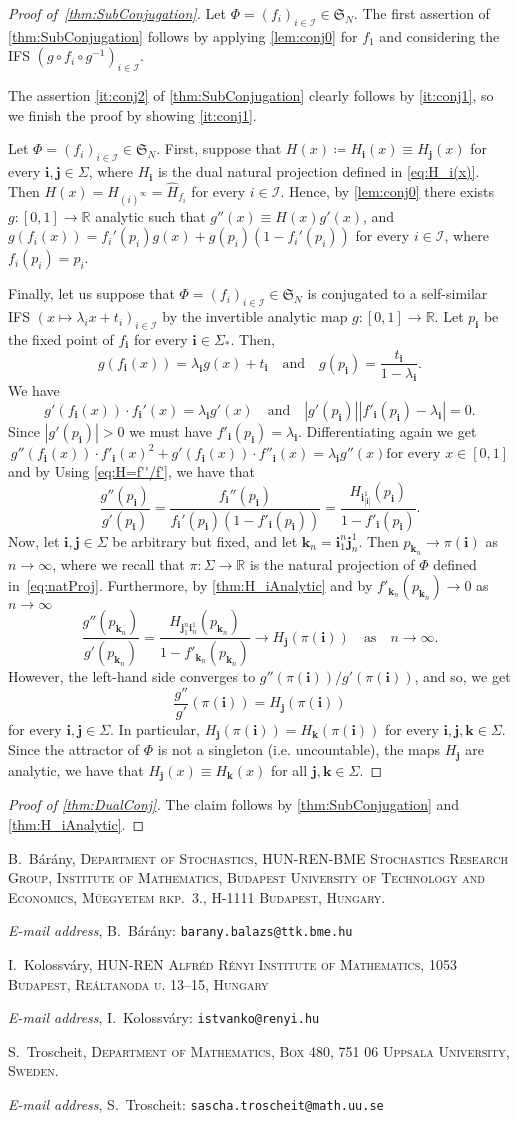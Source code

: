 \documentclass[11pt,]{article}
\makeatletter
\def\cref#1{\ref{#1}}%
\theoremstyle{definition}
\theoremstyle{remark}
\newcommand{\0}{\mathbf{0}}
\newcommand{\bi}{\mathbf{i}}
\newcommand{\bj}{\mathbf{j}}
\newcommand{\bk}{{\mathbf{k}}}
\numberwithin{equation}{section}
\newcommand{\Addresses}{{%
  \bigskip
  \footnotesize

  B.~B\'ar\'any, \textsc{Department of Stochastics, HUN-REN-BME Stochastics Research Group,
  Institute of Mathematics, Budapest University of Technology and Economics, M\H{u}egyetem rkp.~3.,
H-1111 Budapest, Hungary.}\par\nopagebreak
  \textit{E-mail address}, B.~B\'ar\'any: \texttt{barany.balazs@ttk.bme.hu}

  \medskip

  I.~Kolossv\'ary, \textsc{HUN-REN Alfr\'ed R\'enyi Institute of Mathematics, 1053 Budapest, Re\'altanoda u.
13–15, Hungary}\par\nopagebreak
  \textit{E-mail address}, I.~Kolossv\'ary: \texttt{istvanko@renyi.hu}
   \medskip


  S.~Troscheit, \textsc{Department of Mathematics, Box 480, 751 06 Uppsala University, Sweden.}\par\nopagebreak
  \textit{E-mail address}, S.~Troscheit: \texttt{sascha.troscheit@math.uu.se}
}}
\makeatother
\begin{document}
\begin{proof}[Proof of~\cref{thm:SubConjugation}]
	Let $\Phi=(f_i)_{i\in\mathcal{I}}\in\mathfrak{S}_N$. The first assertion of
	\cref{thm:SubConjugation} follows by applying \cref{lem:conj0} for $f_1$ and considering the
	IFS $(g\circ f_i\circ g^{-1})_{i\in\mathcal{I}}$.
	
	The assertion \cref{it:conj2} of \cref{thm:SubConjugation} clearly follows by
	\cref{it:conj1}, so we finish the proof by showing \cref{it:conj1}.
	
	Let $\Phi=(f_i)_{i\in\mathcal{I}}\in\mathfrak{S}_N$. First, suppose that $H(x)\coloneqq
	H_{\bi}(x)\equiv H_{\bj}(x)$ for every $\bi,\bj\in\Sigma$, where $H_{\bi}$ is the dual
	natural projection defined in \cref{eq:H_i(x)}. Then $H(x)=H_{(i)^{\infty}}=\hat{H}_{f_i}$
	for every $i\in\mathcal{I}$. Hence, by \cref{lem:conj0} there exists
	$g\colon[0,1]\to\mathbb{R}$ analytic such that $g''(x)\equiv H(x)g'(x)$, and
	$g(f_i(x))=f_i'(p_i)g(x)+g(p_i)(1-f_i'(p_i))$ for every $i\in\mathcal{I}$, where
	$f_i(p_i)=p_i$.
	
	Finally, let us suppose that $\Phi=(f_i)_{i\in\mathcal{I}}\in\mathfrak{S}_N$ is conjugated
	to a self-similar IFS $(x\mapsto \lambda_ix+t_i)_{i\in\mathcal{I}}$ by the invertible
	analytic map $g\colon[0,1]\to\mathbb{R}$. Let $p_{\bi}$ be the fixed point of $f_{\bi}$ for
	every $\bi\in\Sigma_*$. 
	Then,
\[
g(f_{\bi}(x)) = \lambda_{\bi} g(x) + t_{\bi}
\quad\text{and}\quad
g(p_{\bi}) = \frac{t_{\bi}}{1-\lambda_{\bi}}.
\]
We have
\[
g'(f_{\bi}(x))\cdot f_{\bi}'(x) = \lambda_{\bi} g'(x)
\quad\text{and}\quad
|g'(p_{\bi})||f'_{\bi}(p_{\bi})-\lambda_{\bi}| = 0.
\]
Since $|g'(p_{\bi})|>0$ we must have $f'_{\bi}(p_{\bi}) = \lambda_{\bi}$.
Differentiating again we get
\[
g''(f_{\bi}(x))\cdot f'_{\bi}(x)^2 +g'(f_{\bi}(x))\cdot f''_{\bi}(x) = \lambda_{\bi} g''(x)\text{
for every }x\in[0,1]
\]
and by Using \cref{eq:H=f''/f'}, we have that
\[
\frac{g''(p_{\bi})}{g'(p_{\bi})} =
\frac{f_{\bi}''(p_{\bi})}{f_{\bi}'(p_{\bi})(1-f'_{\bi}(p_{\bi}))}
=\frac{H_{\bi_{|\bi|}^1}(p_{\bi})}{1-f'_{\bi}(p_{\bi})}.
\]
Now, let $\bi,\bj\in\Sigma$ be arbitrary but fixed, and let $\bk_n = \bi_1^{n} \bj_n^1$. Then
$p_{\bk_n}\to \pi(\bi)$ as $n\to\infty$, where we recall that $\pi\colon\Sigma\to\mathbb{R}$ is the
natural projection of $\Phi$ defined in~\cref{eq:natProj}. Furthermore, by \cref{thm:H_iAnalytic} and by
$f'_{\bk_n}(p_{\bk_n})\to0$ as $n\to\infty$
\[
\frac{g''(p_{\bk_n})}{g'(p_{\bk_n})}
=\frac{H_{\bj_1^n \bi_n^1}(p_{\bk_n})}{1-f'_{\bk_n}(p_{\bk_n})}
\to
H_{\bj}(\pi(\bi))\quad \text{as}\quad n\to\infty.
\]
However, the left-hand side converges to $g''(\pi(\bi))/g'(\pi(\bi))$, and so, we get 
$$
\frac{g''}{g'}(\pi(\bi))=H_{\bj}(\pi(\bi))
$$
for every $\bi,\bj\in\Sigma$. In particular, $H_{\bj}(\pi(\bi))=H_{\bk}(\pi(\bi))$ for every
$\bi,\bj,\bk\in\Sigma$. Since the attractor of $\Phi$ is not a singleton (i.e. uncountable), the
maps $H_{\bj}$ are analytic, we have that $H_{\bj}(x)\equiv H_{\bk}(x)$ for all $\bj,\bk\in \Sigma$.
\end{proof}

\begin{proof}[Proof of \cref{thm:DualConj}]
	The claim follows by \cref{thm:SubConjugation} and \cref{thm:H_iAnalytic}.
\end{proof}

\printbibliography



\Addresses
\end{document}
